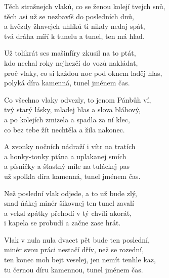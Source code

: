 
\ve{}
Těch strašnejch vlaků, co se ženou kolejí tvejch snů,\\
těch asi už se nezbavíš do posledních dnů,\\
a hvězdy žhavejch uhlíků ti nikdy nedaj spát,\\
tvá dráha míří k tunelu a tunel, ten má hlad.

\ve{}
Už tolikrát ses mašinfíry zkusil na to ptát,\\
kdo nechal roky nejhezčí do vozů nakládat,\\
proč vlaky, co si každou noc pod oknem laděj hlas,\\
polyká díra kamenná, tunel jménem čas.

\ve{}
Co všechno vlaky odvezly, to jenom Pánbůh ví,\\
tvý starý lásky, mladej hlas a slova bláhový,\\
a po kolejích zmizela a spadla za ní klec,\\
co bez tebe žít nechtěla a žila nakonec.

\ve{}
A zvonky nočních nádraží i vítr na tratích\\
a honky-tonky piána a uplakanej smích\\
a písničky a šťastný míle na tuláckej pas\\
už spolkla díra kamenná, tunel jménem čas.

\ve{}
Než poslední vlak odjede, a to už bude zlý,\\
snad ňákej minér šikovnej ten tunel zavalí\\
a veksl zpátky přehodí v tý chvíli akorát,\\
i kapela se probudí a začne zase hrát.

\ve{}
Vlak v nula nula dvacet pět bude ten poslední,\\
minér svou práci nestačí dřív, než se rozední,\\
ten konec moh bejt veselej, jen nemít tenhle kaz,\\
tu černou díru kamennou, tunel jménem čas.

\esong